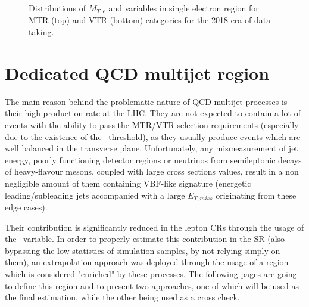 \begin{figure}[htbp]
{    }
  \caption{Distributions of $M_{T,e}$ and \mindphinoe variables in single electron region for MTR (top) and VTR (bottom) categories for the 2018 era of data taking.}
  \label{fig:2018_Wenu_2}
\end{figure}





\section{Dedicated QCD multijet region}

\hspace{10pt} The main reason behind the problematic nature of QCD multijet processes is their high production rate at the LHC. They are not expected to contain a lot of events with the ability to pass the MTR/VTR selection requirements (especially due to the existence of the \mindphi~threshold), as they usually produce events which are well balanced in the transverse plane. Unfortunately, any mismeasurement of jet energy, poorly functioning detector regions or neutrinos from semileptonic decays of heavy-flavour mesons, coupled with large cross sections values, result in a non negligible amount of them containing VBF-like signature (energetic leading/subleading jets accompanied with a large $E_{T,miss}$ originating from these edge cases). 

\hspace{10pt} Their contribution is significantly reduced in the lepton CRs through the usage of the \mindphi~variable. In order to properly estimate this contribution in the SR (also bypassing the low statistics of simulation samples, by not relying simply on them), an extrapolation approach was deployed through the usage of a region which is considered "enriched" by these processes. The following pages are going to define this region and to present two approaches, one of which will be used as the final estimation, while the other being used as a cross check.

